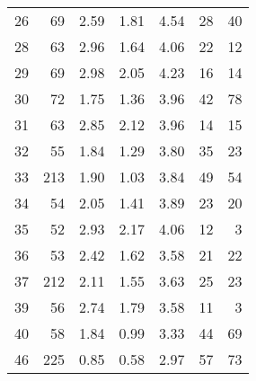 \begin{tabular}{rrrrrrr}
26 &       69 &                             2.59 &                             1.81 &                             4.54 &              28 &              40 \\
28 &       63 &                             2.96 &                             1.64 &                             4.06 &              22 &              12 \\
29 &       69 &                             2.98 &                             2.05 &                             4.23 &              16 &              14 \\
30 &       72 &                             1.75 &                             1.36 &                             3.96 &              42 &              78 \\
31 &       63 &                             2.85 &                             2.12 &                             3.96 &              14 &              15 \\
32 &       55 &                             1.84 &                             1.29 &                             3.80 &              35 &              23 \\
33 &      213 &                             1.90 &                             1.03 &                             3.84 &              49 &              54 \\
34 &       54 &                             2.05 &                             1.41 &                             3.89 &              23 &              20 \\
35 &       52 &                             2.93 &                             2.17 &                             4.06 &              12 &               3 \\
36 &       53 &                             2.42 &                             1.62 &                             3.58 &              21 &              22 \\
37 &      212 &                             2.11 &                             1.55 &                             3.63 &              25 &              23 \\
39 &       56 &                             2.74 &                             1.79 &                             3.58 &              11 &               3 \\
40 &       58 &                             1.84 &                             0.99 &                             3.33 &              44 &              69 \\
46 &      225 &                             0.85 &                             0.58 &                             2.97 &              57 &              73 \\

\end{tabular}

